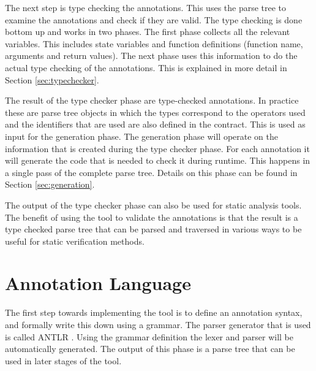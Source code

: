 \documentclass[a4paper]{article}
\begin{document}
The next step is type checking the annotations. This uses the parse tree to examine the annotations and check if they are valid. The type checking is done bottom up and works in two phases. The first phase collects all the relevant variables. This includes state variables and function definitions (function name, arguments and return values). The next phase uses this information to do the actual type checking of the annotations. This is explained in more detail in Section \ref{sec:typechecker}. \par
The result of the type checker phase are type-checked annotations. In practice these are parse tree objects in which the types correspond to the operators used and the identifiers that are used are also defined in the contract. This is used as input for the generation phase. The generation phase will operate on the information that is created during the type checker phase. For each annotation it will generate the code that is needed to check it during runtime. This happens in a single pass of the complete parse tree. Details on this phase can be found in Section \ref{sec:generation}. \par
The output of the type checker phase can also be used for static analysis tools. The benefit of using the tool to validate the annotations is that the result is a type checked parse tree that can be parsed and traversed in various ways to be useful for static verification methods. 

\newpage
\section{Annotation Language}
\label{sec:annotationlanguage}
The first step towards implementing the tool is to define an annotation syntax, and formally write this down using a grammar. The parser generator that is used is called ANTLR \cite{parr2013definitive}. Using the grammar definition the lexer and parser will be automatically generated. The output of this phase is a parse tree that can be used in later stages of the tool.
\end{document}
